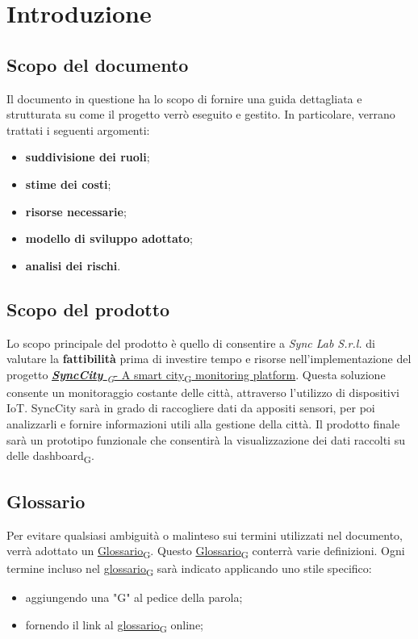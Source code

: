 \section{Introduzione}
\setcounter{subsection}{0}
\subsection{Scopo del documento}
Il documento in questione ha lo scopo di fornire una guida dettagliata e strutturata su come il progetto verrò eseguito e gestito. In particolare, verrano trattati i seguenti argomenti:
\begin{itemize}
	\item \textbf{suddivisione dei ruoli};
	\item \textbf{stime dei costi};
	\item \textbf{risorse necessarie};
	\item \textbf{modello di sviluppo adottato};
	\item \textbf{analisi dei rischi}.
\end{itemize}

\subsection{Scopo del prodotto}
Lo scopo principale del prodotto è quello di consentire a \textit{Sync Lab S.r.l.} di valutare la \textbf{fattibilità} prima di investire tempo e risorse nell'implementazione del progetto  \href{https://7last.github.io/docs/rtb/documentazione-interna/glossario\#synccity}{\textit{\textbf{SyncCity} \textsubscript{G}}- A \href{https://7last.github.io/docs/rtb/documentazione-interna/glossario\#smart-city}{smart city\textsubscript{G}} monitoring platform}. Questa soluzione consente un monitoraggio costante delle città, attraverso l'utilizzo di dispositivi IoT. SyncCity sarà in grado di raccogliere dati da appositi sensori, per poi analizzarli e fornire informazioni utili alla gestione della città. Il prodotto finale sarà un prototipo funzionale che consentirà la visualizzazione dei dati raccolti su delle {dashboard\textsubscript{G}}.

\subsection{Glossario}
Per evitare qualsiasi ambiguità o malinteso sui termini utilizzati nel documento, verrà adottato un \href{https://7last.github.io/docs/rtb/documentazione-interna/glossario#glossario}{Glossario\textsubscript{G}}. Questo \href{https://7last.github.io/docs/rtb/documentazione-interna/glossario#glossario}{Glossario\textsubscript{G}} conterrà varie definizioni. Ogni termine incluso nel \href{https://7last.github.io/docs/rtb/documentazione-interna/glossario#glossario}{glossario\textsubscript{G}} sarà indicato applicando uno stile specifico:
\begin{itemize}
	\item aggiungendo una "G" al pedice della parola;
	\item fornendo il link al \href{https://7last.github.io/docs/rtb/documentazione-interna/glossario\#glossario}{glossario\textsubscript{G}} online;
\end{itemize}

